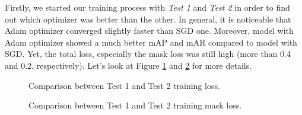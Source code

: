 	Firstly, we started our training process with \textit{Test 1} and \textit{Test 2} in order to find out which optimizer was better than the other. In general, it is noticeable that Adam optimizer converged slightly faster than SGD one. Moreover, model with Adam optimizer showed a much better mAP and mAR compared to model with SGD. Yet, the total loss, especially the mask loss was still high (more than 0.4 and 0.2, respectively). Let's look at Figure \ref{fig:loss_12} and \ref{fig:mask_loss_12} for more details.
	
	\begin{figure}[H]
		\centering
		\hfill %
		\hfill %
		\caption{Comparison between Test 1 and Test 2 training loss.}
		\label{fig:loss_12}
	\end{figure}
	
	\begin{figure}[H]
		\centering
		\hfill %
		\hfill %
		\caption{Comparison between Test 1 and Test 2 training mask loss.}
		\label{fig:mask_loss_12}
	\end{figure}

